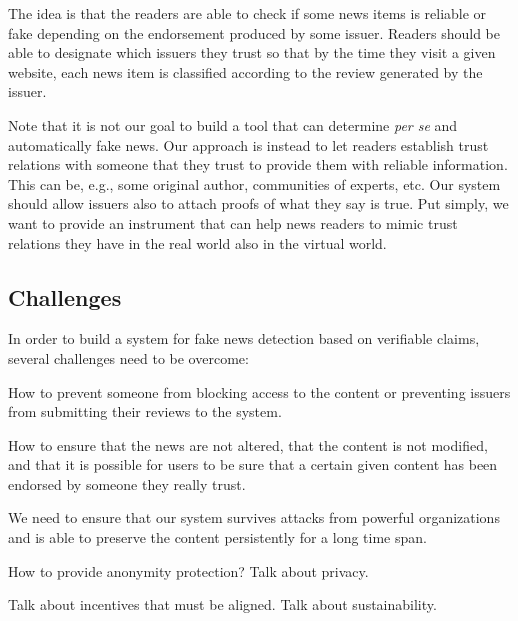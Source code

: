The idea is that the readers are able to check if some news items is reliable or fake depending on the endorsement produced by some issuer. Readers should be able to designate which issuers they trust so that by the time they visit a given website, each news item is classified according to the review generated by the issuer.

Note that it is not our goal to build a tool that can determine {\em per se} and automatically fake news. Our approach is instead to let readers establish trust relations with someone that they trust to provide them with reliable information. This can be, e.g., some original author, communities of experts, etc. Our system should allow issuers also to attach proofs of what they say is true. Put simply, we want to provide an instrument that can help news readers to mimic trust relations they have in the real world also in the virtual world.


\subsection{Challenges}

In order to build a system for fake news detection based on verifiable claims, several challenges need to be overcome:

 How to prevent someone from blocking access to the content or preventing issuers from submitting their reviews to the system.

 How to ensure that the news are not altered, that the content is not modified, and that it is possible for users to be sure that a certain given content has been endorsed by someone they really trust.

 We need to ensure that our system survives attacks from powerful organizations and is able to preserve the content persistently for a long time span.

 How to provide anonymity protection? Talk about privacy. 

 Talk about incentives that must be aligned. Talk about sustainability.


